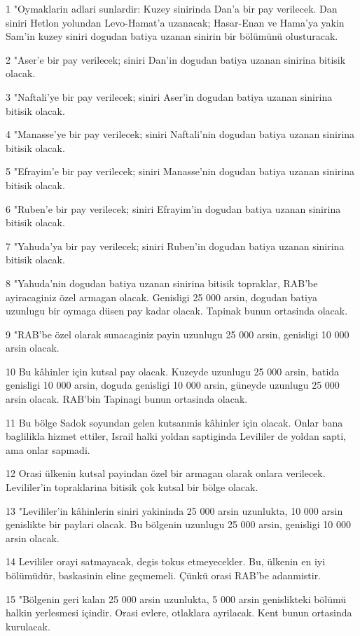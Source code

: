 \par 1 "Oymaklarin adlari sunlardir: Kuzey sinirinda Dan'a bir pay verilecek. Dan siniri Hetlon yolundan Levo-Hamat'a uzanacak; Hasar-Enan ve Hama'ya yakin Sam'in kuzey siniri dogudan batiya uzanan sinirin bir bölümünü olusturacak.
\par 2 "Aser'e bir pay verilecek; siniri Dan'in dogudan batiya uzanan sinirina bitisik olacak.
\par 3 "Naftali'ye bir pay verilecek; siniri Aser'in dogudan batiya uzanan sinirina bitisik olacak.
\par 4 "Manasse'ye bir pay verilecek; siniri Naftali'nin dogudan batiya uzanan sinirina bitisik olacak.
\par 5 "Efrayim'e bir pay verilecek; siniri Manasse'nin dogudan batiya uzanan sinirina bitisik olacak.
\par 6 "Ruben'e bir pay verilecek; siniri Efrayim'in dogudan batiya uzanan sinirina bitisik olacak.
\par 7 "Yahuda'ya bir pay verilecek; siniri Ruben'in dogudan batiya uzanan sinirina bitisik olacak.
\par 8 "Yahuda'nin dogudan batiya uzanan sinirina bitisik topraklar, RAB'be ayiracaginiz özel armagan olacak. Genisligi 25 000 arsin, dogudan batiya uzunlugu bir oymaga düsen pay kadar olacak. Tapinak bunun ortasinda olacak.
\par 9 "RAB'be özel olarak sunacaginiz payin uzunlugu 25 000 arsin, genisligi 10 000 arsin olacak.
\par 10 Bu kâhinler için kutsal pay olacak. Kuzeyde uzunlugu 25 000 arsin, batida genisligi 10 000 arsin, doguda genisligi 10 000 arsin, güneyde uzunlugu 25 000 arsin olacak. RAB'bin Tapinagi bunun ortasinda olacak.
\par 11 Bu bölge Sadok soyundan gelen kutsanmis kâhinler için olacak. Onlar bana baglilikla hizmet ettiler, Israil halki yoldan saptiginda Levililer de yoldan sapti, ama onlar sapmadi.
\par 12 Orasi ülkenin kutsal payindan özel bir armagan olarak onlara verilecek. Levililer'in topraklarina bitisik çok kutsal bir bölge olacak.
\par 13 "Levililer'in kâhinlerin siniri yakininda 25 000 arsin uzunlukta, 10 000 arsin genislikte bir paylari olacak. Bu bölgenin uzunlugu 25 000 arsin, genisligi 10 000 arsin olacak.
\par 14 Levililer orayi satmayacak, degis tokus etmeyecekler. Bu, ülkenin en iyi bölümüdür, baskasinin eline geçmemeli. Çünkü orasi RAB'be adanmistir.
\par 15 "Bölgenin geri kalan 25 000 arsin uzunlukta, 5 000 arsin genislikteki bölümü halkin yerlesmesi içindir. Orasi evlere, otlaklara ayrilacak. Kent bunun ortasinda kurulacak.
